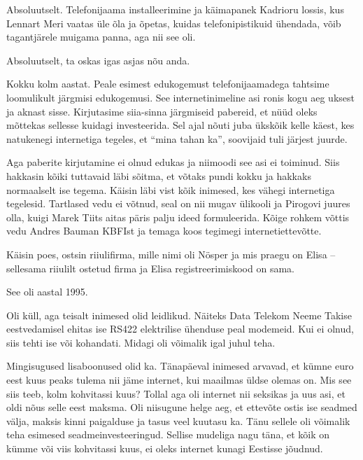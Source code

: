 
Absoluutselt. Telefonijaama installeerimine ja käimapanek Kadrioru lossis, 
kus Lennart Meri vaatas üle õla ja õpetas, kuidas 
telefonipistikuid ühendada, võib tagantjärele muigama panna, aga nii see 
oli. 


Absoluutselt, ta oskas igas asjas nõu anda.


Kokku kolm aastat. Peale esimest edukogemust telefonijaamadega tahtsime loomulikult 
järgmisi edukogemusi. See internetinimeline asi ronis 
kogu aeg uksest ja aknast sisse. Kirjutasime siia-sinna järgmiseid pabereid, et 
nüüd oleks mõttekas sellesse kuidagi investeerida. Sel ajal nõuti juba ükskõik kelle käest, kes natukenegi internetiga tegeles, et \enquote{mina tahan ka}, soovijaid tuli järjest juurde. 

Aga paberite kirjutamine ei olnud edukas ja niimoodi see asi ei toiminud. Siis hakkasin kõiki tuttavaid 
läbi sõitma, et võtaks pundi kokku ja hakkaks 
normaalselt ise tegema. Käisin läbi vist kõik inimesed, kes vähegi 
internetiga tegelesid. Tartlased vedu ei võtnud, seal on nii mugav ülikooli ja Pirogovi juures olla, kuigi Marek Tiits aitas päris palju ideed formuleerida. Kõige rohkem võttis 
vedu Andres Bauman KBFIst ja temaga 
koos tegimegi internetiettevõtte. 

Käisin poes, ostsin riiulifirma, mille nimi oli 
Nösper ja mis praegu on Elisa -- sellesama 
riiulilt ostetud firma ja Elisa registreerimiskood on sama. 


See oli aastal 1995.


Oli küll, aga teisalt inimesed olid leidlikud. Näiteks Data Telekom Neeme Takise eestvedamisel ehitas ise RS422 
elektrilise ühenduse peal modemeid. Kui ei olnud, siis tehti ise või kohandati. Midagi oli võimalik igal juhul teha.

Mingisugused lisaboonused olid ka. Tänapäeval inimesed arvavad, et kümne 
euro eest kuus peaks tulema nii jäme internet, kui maailmas üldse olemas on. 
Mis see siis teeb, kolm kohvitassi kuus? Tollal aga oli internet nii seksikas 
ja uus asi, et oldi nõus selle eest maksma. Oli niisugune helge aeg, et ettevõte ostis ise seadmed välja, maksis kinni paigalduse ja tasus veel 
kuutasu ka. Tänu sellele oli 
võimalik teha esimesed seadmeinvesteeringud. Sellise mudeliga nagu täna, et kõik on kümme või viis kohvitassi kuus, ei oleks internet kunagi Eestisse 
jõudnud.

